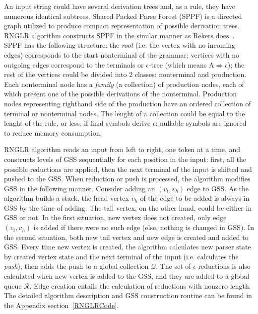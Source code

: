 An input string could have several derivation trees and, as a rule, they have 
numerous identical subtrees. Shared Packed Parse Forest (SPPF) is a directed graph
utilized to produce compact representation of possible derivation trees. RNGLR 
algorithm constructs SPPF in the similar manner as Rekers does~\cite{SPPF}. 
SPPF has the following structure: the \emph{root} (i.e. the vertex
with no incoming edges) corresponds to the start nonterminal of the grammar; vertices 
with no outgoing edges correspond to the terminals or $\epsilon$-tree (which means 
$\mathrm{A} \Rightarrow \epsilon$); the rest of the vertices could be 
divided into 2 classes: nonterminal and production. Each nonterminal node has a 
\emph{family} (a collection) of production nodes, each of which present one of the 
possible derivations of the nonterminal. Production nodes representing righthand side 
of the production have an ordered collection of terminal or nonterminal nodes. The 
lenght of a collection could be equal to the lenght of the rule, or less, if final 
symbols derive $\epsilon$: nullable symbols are ignored to reduce memory consumption. 

RNGLR algorithm reads an input from left to right, one token at a time, and 
constructs levels of GSS sequentially for each position in the input: first, all the 
possible reductions are applied, then the next terminal of the input is shifted and
pushed to the GSS. When reduction or push is processed, the algorithm modifies GSS in 
the following manner. Consider adding an $(v_{t}, v_{h})$ edge to GSS. As the algorithm
builds a stack, the head vertex $v_{h}$ of the edge to be added is always in GSS by the 
time of adding. The tail vertex, on the other hand, could be either in GSS or not. In 
the first situation, new vertex does not created, only edge $(v_{t}, v_{h})$ is added 
if there were no such edge (else, nothing is changed in GSS). In the second situation, 
both new tail vertex and new edge is created and added to GSS. Every time new vertex
is created, the algorithm calculates new parser state by created vertex state and the 
next terminal of the input (i.e. calculates the \emph{push}), then adds the push to a
global collection $\mathcal{Q}$. The set of $\epsilon$-reductions is also calculated 
when new vertex is added to the GSS, and they are added to a global queue $\mathcal{R}$.
Edge creation entails the calculation of reductions with nonzero length. The detailed 
algorithm description and GSS construction routine can be found in the Appendix 
section~\ref{RNGLRCode}. 

